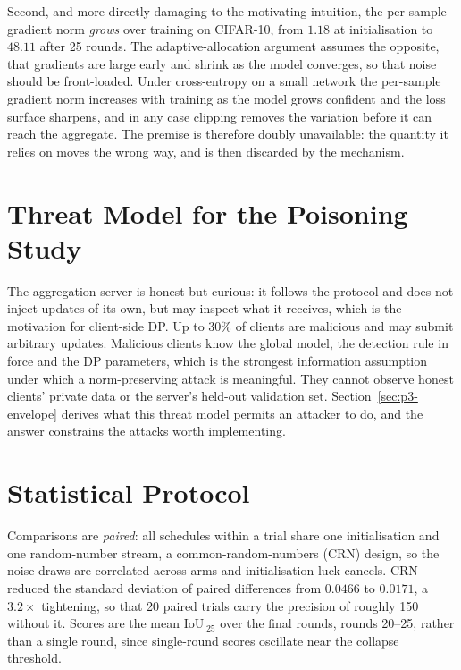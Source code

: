 \vspace{10pt}

Second, and more directly damaging to the motivating intuition, the per-sample
gradient norm \emph{grows} over training on CIFAR-10, from $1.18$ at
initialisation to $48.11$ after 25 rounds. The adaptive-allocation argument
assumes the opposite, that gradients are large early and shrink as the model
converges, so that noise should be front-loaded. Under cross-entropy on a small
network the per-sample gradient norm increases with training as the model grows
confident and the loss surface sharpens, and in any case clipping removes the
variation before it can reach the aggregate. The premise is therefore doubly
unavailable: the quantity it relies on moves the wrong way, and is then
discarded by the mechanism.

\section{Threat Model for the Poisoning Study}

The aggregation server is honest but curious: it follows the protocol and does
not inject updates of its own, but may inspect what it receives, which is the
motivation for client-side DP. Up to $30\%$ of clients are malicious and may
submit arbitrary updates. Malicious clients know the global model, the detection
rule in force and the DP parameters, which is the strongest information
assumption under which a norm-preserving attack is meaningful. They cannot
observe honest clients' private data or the server's held-out validation set.
Section~\ref{sec:p3-envelope} derives what this threat model permits an attacker
to do, and the answer constrains the attacks worth implementing.

\section{Statistical Protocol}
\label{sec:protocol}

Comparisons are \emph{paired}: all schedules within a trial share one
initialisation and one random-number stream, a common-random-numbers (CRN)
design, so the noise draws are correlated across arms and initialisation luck
cancels. CRN reduced the standard deviation of paired differences from $0.0466$
to $0.0171$, a $3.2\times$ tightening, so that 20 paired trials carry the
precision of roughly 150 without it. Scores are the mean IoU$_{.25}$ over the
final rounds, rounds 20--25, rather than a single round, since single-round
scores oscillate near the collapse threshold.


